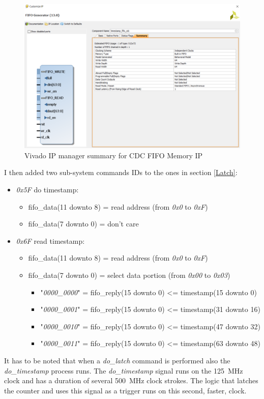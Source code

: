 \begin{figure}[H]
	\centering
	\includegraphics[width=0.6\linewidth]{IMG/ch4/FIFO_IP}
	\caption{Vivado IP manager summary for CDC FIFO Memory IP}
	\label{fig:fifo_ip}
\end{figure}
\noindent I then added two sub-system commands IDs to the ones in section \ref{Latch}:
\begin{itemize}
	\item \textit{0x5F} do timestamp:
	\begin{itemize}
		\item fifo\_data(11 downto 8) = read address (from \textit{0x0} to \textit{0xF})
		\item fifo\_data(7 downto 0) = don't care
	\end{itemize}
	\item \textit{0x6F} read timestamp:
	\begin{itemize}
		\item fifo\_data(11 downto 8) = read address (from \textit{0x0} to \textit{0xF})
		\item fifo\_data(7 downto 0) = select data portion (from \textit{0x00} to \textit{0x03})
		\begin{itemize}
			\item "\textit{0000\_0000}" = fifo\_reply(15 downto 0) <= timestamp(15 downto 0)
			\item "\textit{0000\_0001}" = fifo\_reply(15 downto 0) <= timestamp(31 downto 16)
			\item "\textit{0000\_0010}" = fifo\_reply(15 downto 0) <= timestamp(47 downto 32)
			\item "\textit{0000\_0011}" = fifo\_reply(15 downto 0) <= timestamp(63 downto 48)
		\end{itemize}
	\end{itemize}
\end{itemize}
\noindent It has to be noted that when a \textit{do\_latch} command is performed also the \textit{do\_timestamp} process runs.
The \textit{do\_timestamp} signal runs on the 125~MHz clock and has a duration of several 500~MHz clock strokes. The logic that latches the counter and uses this signal as a trigger runs on this second, faster, clock.
